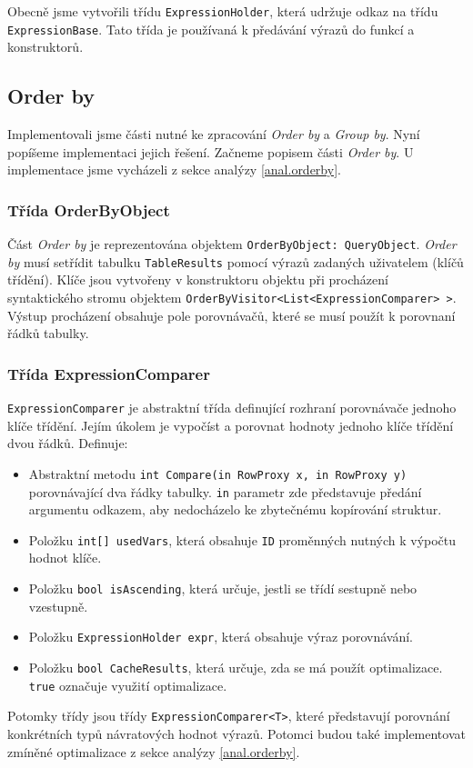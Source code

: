 Obecně jsme vytvořili třídu \texttt{ExpressionHolder}, která udržuje odkaz na třídu \texttt{ExpressionBase}.
Tato třída je používaná k předávání výrazů do funkcí a konstruktorů.

\subsection{Order by}

Implementovali jsme části nutné ke zpracování \textit{Order by} a \textit{Group by}.
Nyní popíšeme implementaci jejich řešení.
Začneme popisem části \textit{Order by}.
U implementace jsme vycházeli z sekce analýzy \ref{anal.orderby}.

\subsubsection{Třída OrderByObject}

Část \textit{Order by} je reprezentována objektem \texttt{OrderByObject: QueryObject}.
\textit{Order by} musí setřídit tabulku \texttt{TableResults} pomocí výrazů zadaných uživatelem (klíčů třídění).
Klíče jsou vytvořeny v konstruktoru objektu při procházení syntaktického stromu objektem \texttt{OrderByVisitor<List<ExpressionComparer> >}.
Výstup procházení obsahuje pole porovnávačů, které se musí použít k porovnaní řádků tabulky.

\subsubsection{Třída ExpressionComparer}

\texttt{ExpressionComparer} je abstraktní třída definující rozhraní porovnávače jednoho klíče třídění.
Jejím úkolem je vypočíst a porovnat hodnoty jednoho klíče třídění dvou řádků.
Definuje:
\begin{itemize}
\item Abstraktní metodu \texttt{int Compare(in RowProxy x, in RowProxy y)} porovnávající dva řádky tabulky.
\texttt{in} parametr zde představuje předání argumentu odkazem, aby nedocházelo ke zbytečnému kopírování struktur.
\item Položku \texttt{int[] usedVars}, která obsahuje \texttt{ID} proměnných nutných k výpočtu hodnot klíče.
\item Položku \texttt{bool isAscending}, která určuje, jestli se třídí sestupně nebo vzestupně.
\item Položku \texttt{ExpressionHolder expr}, která obsahuje výraz porovnávání.
\item Položku \texttt{bool CacheResults}, která určuje, zda se má použít optimalizace.
\texttt{true} označuje využití optimalizace.

\end{itemize}
Potomky třídy jsou třídy \texttt{ExpressionComparer<T>}, které představují porovnání konkrétních typů návratových hodnot výrazů.
Potomci budou také implementovat zmíněné optimalizace z sekce analýzy \ref{anal.orderby}.

